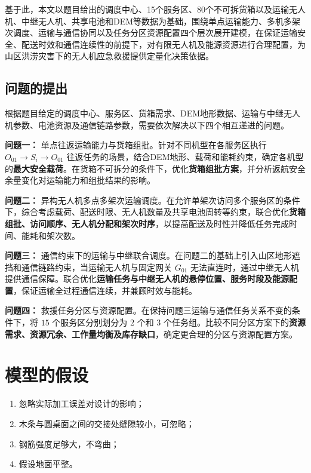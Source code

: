 \documentclass[bwprint,fontset=fandol]{gmcmthesis}
\begin{document}
基于此，本文以题目给出的调度中心、15个服务区、80个不可拆货箱以及运输无人机、中继无人机、共享电池和DEM等数据为基础，围绕单点运输能力、多机多架次调度、运输与通信协同以及任务分区资源配置四个层次展开建模，在保证运输安全、配送时效和通信连续性的前提下，对有限无人机及能源资源进行合理配置，为山区洪涝灾害下的无人机应急救援提供定量化决策依据。
\subsection{问题的提出}


\noindent 根据题目给定的调度中心、服务区、货箱需求、DEM地形数据、运输与中继无人机参数、电池资源及通信链路参数，需要依次解决以下四个相互递进的问题。

\textbf{问题一：} 单点往返运输能力与货箱组批。针对不同机型在各服务区执行
$O_{01}\rightarrow S_i\rightarrow O_{01}$
往返任务的场景，结合DEM地形、载荷和能耗约束，确定各机型的\textbf{最大安全载荷}。在货箱不可拆分的条件下，优化\textbf{货箱组批方案}，并分析返航安全余量变化对运输能力和组批结果的影响。

\textbf{问题二：} 异构无人机多点多架次运输调度。在允许单架次访问多个服务区的条件下，综合考虑载荷、配送时限、无人机数量及共享电池周转等约束，联合优化\textbf{货箱组批、访问顺序、无人机分配和架次时序}，以提高配送及时性并降低任务完成时间、能耗和架次数。

\textbf{问题三：} 通信约束下的运输与中继联合调度。在问题二的基础上引入山区地形遮挡和通信链路约束，当运输无人机与固定网关 $G_{01}$ 无法直连时，通过中继无人机提供通信保障。联合优化\textbf{运输任务与中继无人机的悬停位置、服务时段及能源配置}，保证运输全过程通信连续，并兼顾时效与能耗。

\textbf{问题四：} 救援任务分区与资源配置。在保持问题三运输与通信任务关系不变的条件下，将 $15$ 个服务区分别划分为 $2$ 个和 $3$ 个任务组。比较不同分区方案下的\textbf{资源需求、资源冗余、工作量均衡及库存缺口}，确定更合理的分区与资源配置方案。

\clearpage
\section{模型的假设}

\begin{enumerate}
\item 忽略实际加工误差对设计的影响；
\item 木条与圆桌面之间的交接处缝隙较小，可忽略；
\item 钢筋强度足够大，不弯曲；
\item 假设地面平整。
\end{enumerate}
\end{document}
